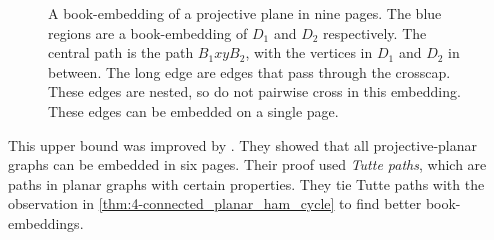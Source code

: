 \begin{figure}[h]
    \centering
    
    \caption[Projective-Planar book-embedding]{A book-embedding of a projective plane in nine pages. The blue regions are a book-embedding of $D_1$ and $D_2$ respectively. The central path is the path $B_1 xy B_2$, with the vertices in $D_1$ and $D_2$ in between. The long edge are edges that pass through the crosscap. These edges are nested, so do not pairwise cross in this embedding. These edges can be embedded on a single page. }\label{fig:projectiveplanarbookembedding}
\end{figure}
 This upper bound was improved by \textcite{ozekiBookEmbeddingGraphs2019}. They showed that all projective-planar graphs can be embedded in six pages. Their proof used \textit{Tutte paths}, which are paths in planar graphs with certain properties. They tie Tutte paths with the observation in \cref{thm:4-connected_planar_ham_cycle} to find better book-embeddings. 
